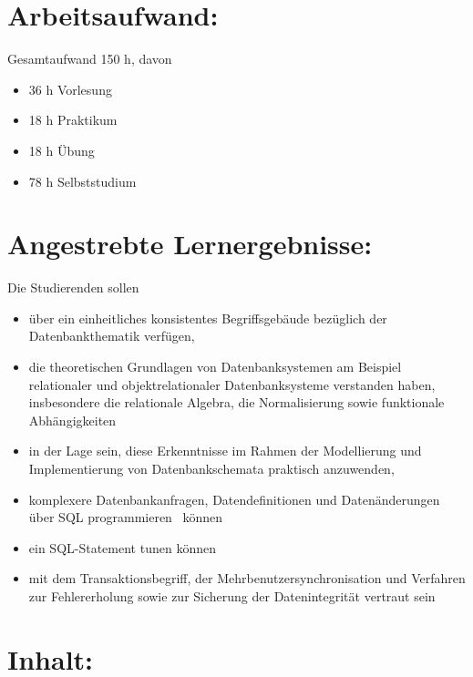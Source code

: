 \section*{Arbeitsaufwand:}\label{arbeitsaufwand-7}

Gesamtaufwand 150 h, davon

\begin{itemize}
\tightlist
\item
  36 h Vorlesung
\item
  18 h Praktikum
\item
  18 h Übung
\item
  78 h Selbststudium
\end{itemize}

\section*{Angestrebte
Lernergebnisse:}\label{angestrebte-lernergebnisse-7}

Die Studierenden sollen

\begin{itemize}
\tightlist
\item
  über ein einheitliches konsistentes Begriffsgebäude bezüglich der
  Datenbankthematik verfügen,
\item
  die theoretischen Grundlagen von Datenbanksystemen am Beispiel
  relationaler und objektrelationaler Datenbanksysteme verstanden haben,
  insbesondere die relationale Algebra, die Normalisierung sowie
  funktionale Abhängigkeiten
\item
  in der Lage sein, diese Erkenntnisse im Rahmen der Modellierung und
  Implementierung von Datenbankschemata praktisch anzuwenden,
\item
  komplexere Datenbankanfragen, Datendefinitionen und Datenänderungen
  über SQL programmieren~ können
\item
  ein SQL-Statement tunen können
\item
  mit dem Transaktionsbegriff, der Mehrbenutzersynchronisation und
  Verfahren zur Fehlererholung sowie zur Sicherung der Datenintegrität
  vertraut sein
\end{itemize}

\section*{Inhalt:}\label{inhalt-7}

